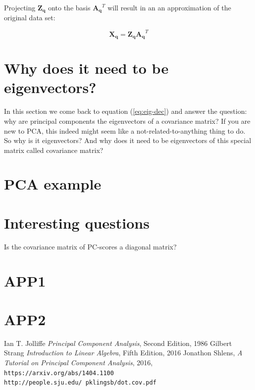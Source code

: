 \documentclass[10pt,twocolumn]{article}
\begin{document}
Projecting $\bm{Z_q}$ onto the basis $\bm{A_q}^T$ will result in an an approximation of the original data set:

\begin{equation}
\bm{X_q} = \bm{Z_q} \bm{A_q}^T
\end{equation}

\section{Why does it need to be eigenvectors?}

In this section we come back to equation (\ref{eq:eig-dec}) and answer the question: why are principal components the eigenvectors of a covariance matrix? If you are new to PCA, this indeed might seem like a not-related-to-anything thing to do. So why is it eigenvectors? And why does it need to be eigenvectors of this special matrix called covariance matrix?

\section{PCA example}


\section{Interesting questions}

Is the covariance matrix of PC-scores a diagonal matrix?

\appendix

\section{APP1} \label{app:A}

\section{APP2} \label{app:B}

\thebibliography{}

 Ian T. Jolliffe \textit{Principal Component Analysis}, Second Edition, 1986
 Gilbert Strang \textit{Introduction to Linear Algebra}, Fifth Edition, 2016
 Jonathon Shlens, \textit{A Tutorial on Principal Component Analysis}, 2016, \texttt{https://arxiv.org/abs/1404.1100}
 \texttt{http://people.sju.edu/~pklingsb/dot.cov.pdf}

 \label{bib:pope}
\end{document}
